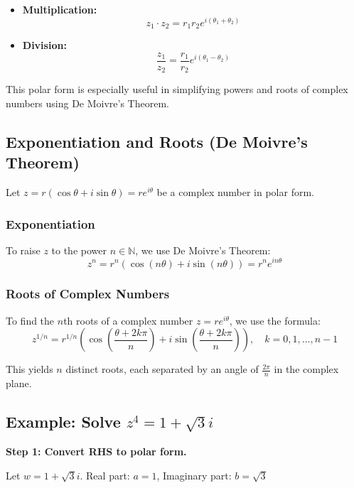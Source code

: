 \begin{itemize}
	\item \textbf{Multiplication:}
	      \[
		      z_1 \cdot z_2 = r_1 r_2 e^{i(\theta_1 + \theta_2)}
	      \]

	\item \textbf{Division:}
	      \[
		      \frac{z_1}{z_2} = \frac{r_1}{r_2} e^{i(\theta_1 - \theta_2)}
	      \]
\end{itemize}

This polar form is especially useful in simplifying powers and roots of complex numbers using De Moivre’s Theorem.

\subsection{Exponentiation and Roots (De Moivre's Theorem)}

Let \( z = r(\cos \theta + i \sin \theta) = re^{i\theta} \) be a complex number in polar form.

\subsubsection{Exponentiation}

To raise \( z \) to the power \( n \in \mathbb{N} \), we use De Moivre’s Theorem:
\[
	z^n = r^n (\cos(n\theta) + i \sin(n\theta)) = r^n e^{in\theta}
\]

\subsubsection{Roots of Complex Numbers}

To find the \( n \)th roots of a complex number \( z = r e^{i\theta} \), we use the formula:
\[
	z^{1/n} = r^{1/n} \left( \cos\left( \frac{\theta + 2k\pi}{n} \right) + i \sin\left( \frac{\theta + 2k\pi}{n} \right) \right), \quad k = 0, 1, \ldots, n-1
\]

This yields \( n \) distinct roots, each separated by an angle of \( \frac{2\pi}{n} \) in the complex plane.

\subsection{Example: Solve \texorpdfstring{\( z^4 = 1 + \sqrt{3}i \)}{}}

\textbf{Step 1: Convert RHS to polar form.}

Let \( w = 1 + \sqrt{3}i \).
Real part: \( a = 1 \), Imaginary part: \( b = \sqrt{3} \)

